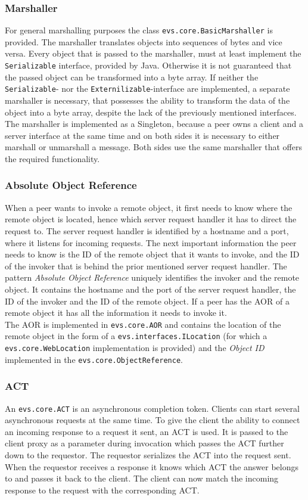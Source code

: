 \subsubsection{Marshaller}
For general marshalling purposes the class \texttt{evs.core.BasicMarshaller} is provided. The marshaller translates objects into sequences of bytes and vice versa. Every object that is passed to the marshaller, must at least implement the \texttt{Serializable} interface, provided by Java. Otherwise it is not guaranteed that the passed object can be transformed into a byte array. If neither the \texttt{Serializable}- nor the \texttt{Externilizable}-interface are implemented, a separate marshaller is necessary, that possesses the ability to transform the data of the object into a byte array, despite the lack of the previously mentioned interfaces. The marshaller is implemented as a Singleton, because a peer owns a client and a server interface at the same time and on both sides it is necessary to either marshall or unmarshall a message. Both sides use the same marshaller that offers the required functionality.

\subsubsection{Absolute Object Reference}
When a peer wants to invoke a remote object, it first needs to know where the remote object is located, hence which server request handler it has to direct the request to. The server request handler is identified by a hostname and a port, where it listens for incoming requests. The next important information the peer needs to know is the ID of the remote object that it wants to invoke, and the ID of the invoker that is behind the prior mentioned server request handler. The pattern \textit{Absolute Object Reference} uniquely identifies the invoker and the remote object. It contains the hostname and the port of the server request handler, the ID of the invoker and the ID of the remote object. If a peer has the AOR of a remote object it has all the information it needs to invoke it. \\
The AOR is implemented in \texttt{evs.core.AOR} and contains the location of the remote object in the form of a \texttt{evs.interfaces.ILocation} (for which a \texttt{evs.core.WebLocation} implementation is provided) and the \textit{Object ID} implemented in the \texttt{evs.core.ObjectReference}.

\subsubsection{ACT}
An \texttt{evs.core.ACT} is an asynchronous completion token. Clients can start several asynchronous requests at the same time. To give the client the ability to connect an incoming response to a request it sent, an ACT is used. It is passed to the client proxy as a parameter during invocation which passes the ACT further down to the requestor. The requestor serializes the ACT into the request sent. When the requestor receives a response it knows which ACT the answer belongs to and passes it back to the client. The client can now match the incoming response to the request with the corresponding ACT. 

